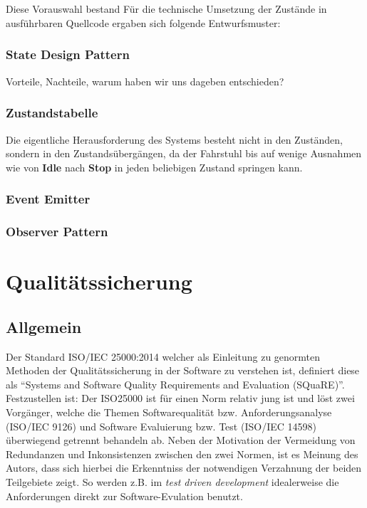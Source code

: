 \paragraph{}Diese Vorauswahl bestand
Für die technische Umsetzung der Zustände in ausführbaren Quellcode ergaben sich folgende Entwurfsmuster:
\subsection*{State Design Pattern}
Vorteile, Nachteile, warum haben wir uns dageben entschieden?
\subsection*{Zustandstabelle}

Die eigentliche Herausforderung des Systems besteht nicht in den Zuständen, sondern in den Zustandsübergängen, da der Fahrstuhl bis auf wenige Ausnahmen wie von \textbf{Idle} nach \textbf{Stop} in jeden beliebigen Zustand springen kann.
\subsection*{Event Emitter}
\subsection{Observer Pattern}

\chapter{Qualitätssicherung}
\section{Allgemein}
Der Standard ISO/IEC 25000:2014 welcher als Einleitung zu genormten Methoden der Qualitätssicherung in der Software zu verstehen ist, definiert diese als "`Systems and Software Quality Requirements and Evaluation (SQuaRE)"'\cite[Foreword]{ISO25000}. Festzustellen ist: Der ISO25000 ist für einen Norm relativ jung ist und löst zwei Vorgänger, welche die Themen Softwarequalität bzw. Anforderungsanalyse (ISO/IEC 9126) und Software Evaluierung bzw. Test (ISO/IEC 14598) überwiegend getrennt behandeln ab. Neben der Motivation der Vermeidung von Redundanzen und Inkonsistenzen zwischen den zwei Normen, ist es Meinung des Autors, dass sich hierbei die Erkenntniss der notwendigen Verzahnung der beiden Teilgebiete zeigt. So werden z.B. im \textit{test driven development} idealerweise die Anforderungen direkt zur Software-Evulation benutzt.

